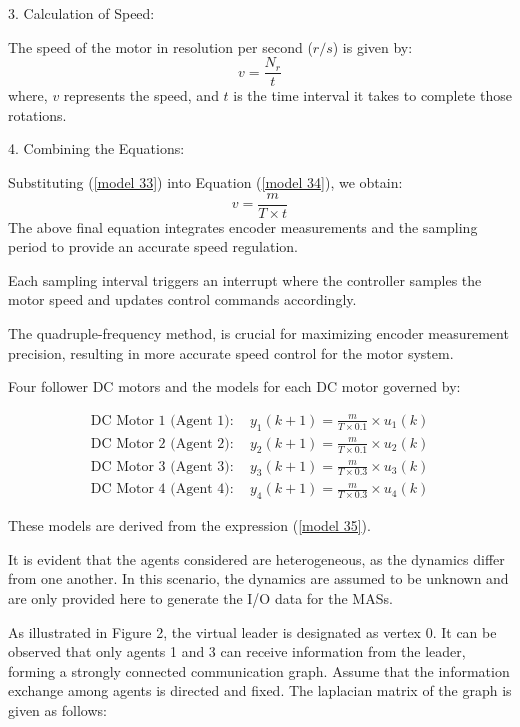 \documentclass[journal,onecolumn]{IEEEtran}
\begin{document}
3. Calculation of Speed:

   The speed of the motor in resolution per second (\( r/s \)) is given by:
   \begin{equation}
       \label{model 34}
       v = \frac{N_r}{t}
   \end{equation}
   where, \( v \) represents the speed, and \( t \) is the time interval it takes to complete those rotations.

4. Combining the Equations:

   Substituting (\ref{model 33}) into Equation (\ref{model 34}), we obtain:
   \begin{equation}
       \label{model 35}
       v = \frac{m}{T \times t}
   \end{equation}
   The above final equation integrates encoder measurements and the sampling period to provide an accurate speed regulation.

Each sampling interval triggers an interrupt where the controller samples the motor speed and updates control commands accordingly.

The quadruple-frequency method,  is crucial for maximizing encoder measurement precision, resulting in more accurate speed control for the motor system.

Four follower DC motors and the models for each DC motor governed by:

\[
\begin{array}{c}
\text{DC Motor 1 (Agent 1)}: \quad y_1(k+1) = \frac{m}{T \times 0.1} \times u_1(k) \\
\text{DC Motor 2 (Agent 2)}: \quad y_2(k+1) = \frac{m}{T \times 0.1} \times u_2(k) \\
\text{DC Motor 3 (Agent 3)}: \quad y_3(k+1) = \frac{m}{T \times 0.3} \times u_3(k) \\
\text{DC Motor 4 (Agent 4)}: \quad y_4(k+1) = \frac{m}{T \times 0.3} \times u_4(k)
\end{array}
\]

    
These models are derived from the expression (\ref{model 35}).

It is evident that the agents considered are heterogeneous, as the dynamics differ from one another. In this scenario, the dynamics are assumed to be unknown and are only provided here to generate the I/O data for the MASs. 

As illustrated in Figure 2, the virtual leader is designated as vertex 0. It can be observed that only agents 1 and 3 can receive information from the leader, forming a strongly connected communication graph. Assume that the information exchange among agents is directed and fixed. The laplacian matrix of the graph is given as follows:
\end{document}
